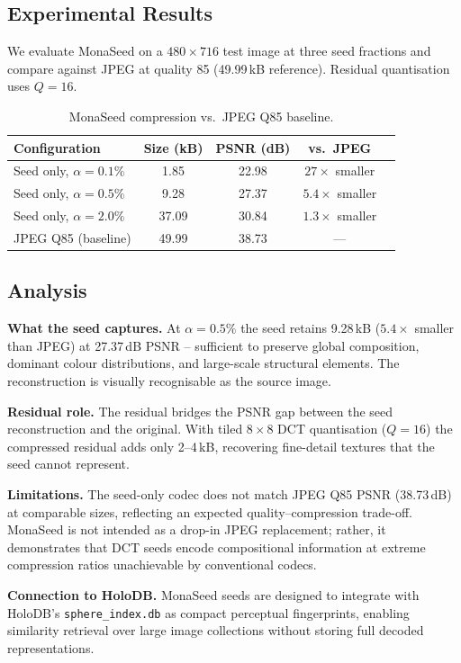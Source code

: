\documentclass[10pt,twocolumn]{article}
\begin{document}
\subsection{Experimental Results}

We evaluate MonaSeed on a $480\times716$ test image at three seed fractions
and compare against JPEG at quality 85 (49.99\,kB reference). Residual
quantisation uses $Q=16$.

\begin{table}[h]
\caption{MonaSeed compression vs.\ JPEG Q85 baseline.}
\label{tab:monaseed}
\begin{tabular}{lcccc}
\toprule
Configuration & Size (kB) & PSNR (dB) & vs.\ JPEG \\
\midrule
Seed only, $\alpha=0.1\%$  &  1.85 & 22.98 & $27\times$ smaller \\
Seed only, $\alpha=0.5\%$  &  9.28 & 27.37 & $5.4\times$ smaller \\
Seed only, $\alpha=2.0\%$  & 37.09 & 30.84 & $1.3\times$ smaller \\
JPEG Q85 (baseline)         & 49.99 & 38.73 & --- \\
\bottomrule
\end{tabular}
\end{table}

\subsection{Analysis}
\textbf{What the seed captures.} At $\alpha=0.5\%$ the seed retains 9.28\,kB
($5.4\times$ smaller than JPEG) at 27.37\,dB PSNR -- sufficient to preserve
global composition, dominant colour distributions, and large-scale structural
elements. The reconstruction is visually recognisable as the source image.

\textbf{Residual role.} The residual bridges the PSNR gap between the seed
reconstruction and the original. With tiled $8\times8$ DCT quantisation
($Q=16$) the compressed residual adds only 2--4\,kB, recovering fine-detail
textures that the seed cannot represent.

\textbf{Limitations.} The seed-only codec does not match JPEG Q85 PSNR
(38.73\,dB) at comparable sizes, reflecting an expected quality--compression
trade-off. MonaSeed is not intended as a drop-in JPEG replacement; rather, it
demonstrates that DCT seeds encode compositional information at extreme
compression ratios unachievable by conventional codecs.

\textbf{Connection to HoloDB.} MonaSeed seeds are designed to integrate with
HoloDB's \texttt{sphere\_index.db} as compact perceptual fingerprints,
enabling similarity retrieval over large image collections without storing
full decoded representations.
\end{document}
